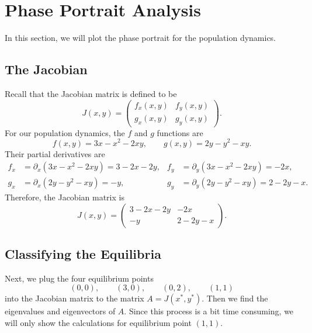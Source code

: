 \documentclass[10pt,letterpaper]{article}
\begin{document}

\section{Phase Portrait Analysis}
In this section, we will plot the phase portrait for the population dynamics.

\subsection{The Jacobian}
Recall that the Jacobian matrix is defined to be
\[
    J(x,y) = \begin{pmatrix}
        f_x(x,y) & f_y(x,y)\\
        g_x(x,y) & g_y(x,y)
    \end{pmatrix}.
\]
For our population dynamics, the $f$ and $g$ functions are
\[
f(x,y)=3x-x^2-2xy,
\qquad
g(x,y)=2y-y^2-xy.
\]
Their partial derivatives are
\begin{align*}
    f_x &= \partial_x(3x-x^2-2xy) = 3-2x-2y, &
    f_y &= \partial_y(3x-x^2-2xy) = -2x,\\
    g_x &= \partial_x(2y-y^2-xy) = -y, &
    g_y &= \partial_y(2y-y^2-xy) = 2-2y-x.
\end{align*}
Therefore, the Jacobian matrix is
\[
J(x,y)=
\begin{pmatrix}
3-2x-2y&-2x\\
-y&2-2y-x
\end{pmatrix}.
\]

\subsection{Classifying the Equilibria}

Next, we plug the four equilibrium points 
$$
(0,0),\qquad(3,0),\qquad(0,2),\qquad(1,1)
$$
into the Jacobian matrix to the matrix $A=J(x^*,y^*)$. Then we find the eigenvalues and eigenvectors of $A$. Since this process is a bit time consuming, we will only show the calculations for equilibrium point $(1,1)$.  
\end{document}
